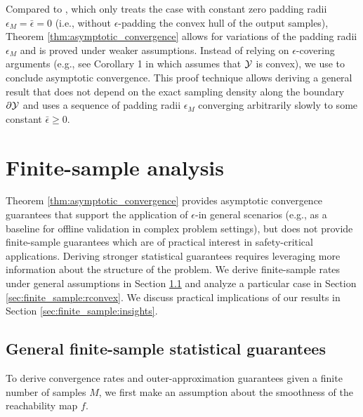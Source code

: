 \documentclass[12pt]{l4dc2022} %
\begin{document}
Compared to \citep[Theorem 2]{LewPavone2020}, which only treats the case with constant zero padding radii $\epsilon_M=\bar\epsilon=0$ (i.e., without $\epsilon$-padding the convex hull of the output samples), Theorem \ref{thm:asymptotic_convergence} allows for variations of the padding radii $\epsilon_M$ and is proved under weaker assumptions. 
Instead of relying on %
$\epsilon$-covering arguments (e.g., see Corollary 1 in \citep{Dumbgen1996} which %
assumes that $\mathcal{Y}$ is convex), we use \citep[Proposition 1.7.23]{Molchanov_BookTheoryOfRandomSets2017}  to conclude asymptotic convergence. 
This proof technique allows deriving a general result that does not depend on the exact sampling density along the boundary $\partial\mathcal{Y}$ and uses a sequence of padding radii $\epsilon_M$ converging arbitrarily slowly to some constant $\bar{\epsilon}\geq 0$. 
% 















\section{Finite-sample analysis}\label{sec:finite_sample}

Theorem \ref{thm:asymptotic_convergence} provides asymptotic convergence guarantees that support the application of $\epsilon$-\randup in general scenarios (e.g., as a baseline for offline validation in complex problem settings), but does not provide finite-sample guarantees which are of practical interest in safety-critical applications. 
Deriving stronger statistical guarantees requires leveraging more information about the structure of the problem. We derive finite-sample rates under general assumptions in Section \ref{sec:finite_sample:general} and analyze a particular case in Section \ref{sec:finite_sample:rconvex}. 
We discuss practical implications of our results in Section \ref{sec:finite_sample:insights}.
% 

\subsection{General finite-sample statistical guarantees}\label{sec:finite_sample:general} 

To derive convergence rates and outer-approximation guarantees given a finite number of samples $M$, 
we first make an assumption   
about the smoothness of the reachability map $f$.
\end{document}
